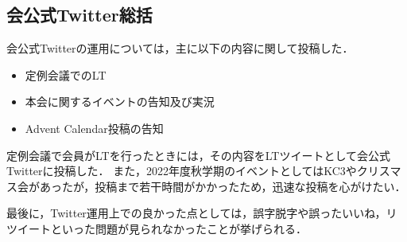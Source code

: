 \subsection*{会公式Twitter総括}

会公式Twitterの運用については，主に以下の内容に関して投稿した．

\begin{itemize}
\item 定例会議でのLT
\item 本会に関するイベントの告知及び実況
\item Advent Calendar投稿の告知
\end{itemize}

定例会議で会員がLTを行ったときには，その内容をLTツイートとして会公式Twitterに投稿した．
また，2022年度秋学期のイベントとしてはKC3やクリスマス会があったが，投稿まで若干時間がかかったため，迅速な投稿を心がけたい．

最後に，Twitter運用上での良かった点としては，誤字脱字や誤ったいいね，リツイートといった問題が見られなかったことが挙げられる．